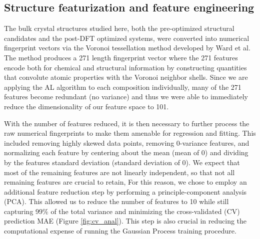 

\subsection{Structure featurization and feature engineering}
%

%
The bulk crystal structures studied here,
both the pre-optimized structural candidates and the post-DFT optimized systems,
were converted into numerical fingerprint vectors via the Voronoi tessellation method developed by Ward et al.~\cite{Ward2017}
%
The method produces a \num{271} length fingerprint vector where the \num{271} features encode both for chemical and structural information by constructing quantities that convolute atomic properties with the Voronoi neighbor shells.
%
Since we are applying the AL algorithm to each composition individually,
many of the \num{271} features become redundant (no variance) and thus we were able to immediately reduce the dimensionality of our feature space to \num{101}.


%
With the number of features reduced, it is then necessary to further process the raw numerical fingerprints to make them amenable for regression and fitting.
%
This included removing highly skewed data points, removing 0-variance features, and normalizing each feature by centering about the mean (mean of 0) and dividing by the features standard deviation (standard deviation of 0).
%
We expect that most of the remaining features are not linearly independent,
so that not all remaining features are crucial to retain,
%
For this reason, we chose to employ an additional feature reduction step by performing a principle-component analysis (PCA).
%
This allowed us to reduce the number of features to \num{10} while still capturing 99\% of the total variance and minimizing the cross-validated (CV) prediction MAE (Figure \ref{fig:cv_anal}).
%
This step is also crucial in reducing the computational expense of running the Gaussian Process training procedure.

